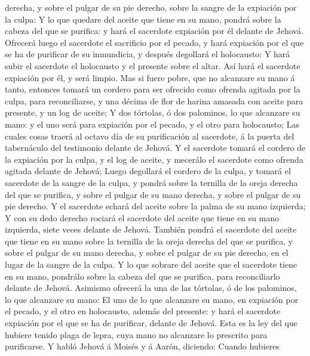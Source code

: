 derecha, y sobre el pulgar de su pie derecho, sobre la sangre de la
expiación por la culpa:  Y lo que quedare del aceite que
tiene en su mano, pondrá sobre la cabeza del que se purifica: y hará el
sacerdote expiación por él delante de Jehová.  Ofrecerá
luego el sacerdote el sacrificio por el pecado, y hará expiación por el
que se ha de purificar de su inmundicia, y después degollará el
holocausto:  Y hará subir el sacerdote el holocausto y el
presente sobre el altar. Así hará el sacerdote expiación por él, y será
limpio.  Mas si fuere pobre, que no alcanzare su mano á
tanto, entonces tomará un cordero para ser ofrecido como ofrenda agitada
por la culpa, para reconciliarse, y una décima de flor de harina amasada
con aceite para presente, y un log de aceite;  Y dos
tórtolas, ó dos palominos, lo que alcanzare su mano: y el uno será para
expiación por el pecado, y el otro para holocausto;  Las
cuales cosas traerá al octavo día de su purificación al sacerdote, á la
puerta del tabernáculo del testimonio delante de Jehová.  Y
el sacerdote tomará el cordero de la expiación por la culpa, y el log de
aceite, y mecerálo el sacerdote como ofrenda agitada delante de Jehová;
 Luego degollará el cordero de la culpa, y tomará el
sacerdote de la sangre de la culpa, y pondrá sobre la ternilla de la
oreja derecha del que se purifica, y sobre el pulgar de su mano derecha,
y sobre el pulgar de su pie derecho.  Y el sacerdote echará
del aceite sobre la palma de su mano izquierda;  Y con su
dedo derecho rociará el sacerdote del aceite que tiene en su mano
izquierda, siete veces delante de Jehová.  También pondrá
el sacerdote del aceite que tiene en su mano sobre la ternilla de la
oreja derecha del que se purifica, y sobre el pulgar de su mano derecha,
y sobre el pulgar de su pie derecho, en el lugar de la sangre de la
culpa.  Y lo que sobrare del aceite que el sacerdote tiene
en su mano, pondrálo sobre la cabeza del que se purifica, para
reconciliarlo delante de Jehová.  Asimismo ofrecerá la una
de las tórtolas, ó de los palominos, lo que alcanzare su mano:
 El uno de lo que alcanzare su mano, en expiación por el
pecado, y el otro en holocausto, además del presente: y hará el
sacerdote expiación por el que se ha de purificar, delante de Jehová.
 Esta es la ley del que hubiere tenido plaga de lepra, cuya
mano no alcanzare lo prescrito para purificarse.  Y habló
Jehová á Moisés y á Aarón, diciendo:  Cuando hubieres
